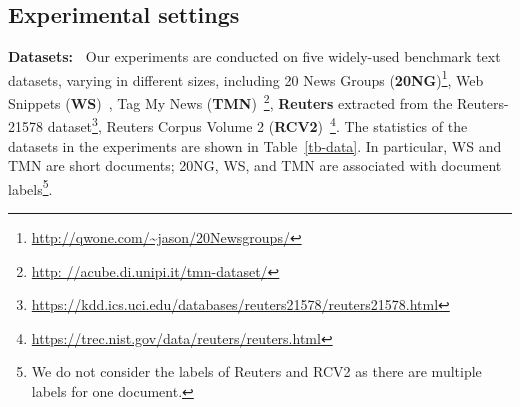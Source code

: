 \documentclass{article}
\newcommand{\rowa}[1]{\renewcommand{\arraystretch}{#1}}
\begin{document}
\subsection{Experimental settings}
\textbf{Datasets:~}
Our experiments are conducted on five widely-used benchmark text datasets, varying in different sizes, including 20 News Groups (\textbf{20NG})\footnote{\url{http://qwone.com/~jason/20Newsgroups/}}, Web Snippets (\textbf{WS})~\citep{phan2008learning}, Tag My News (\textbf{TMN})~\citep{vitale2012classification}\footnote{\url{http: //acube.di.unipi.it/tmn-dataset/}}, \textbf{Reuters} extracted from the Reuters-21578 dataset\footnote{\url{https://kdd.ics.uci.edu/databases/reuters21578/reuters21578.html}}, Reuters Corpus Volume 2 (\textbf{RCV2})~\citep{lewis2004rcv1}\footnote{\url{https://trec.nist.gov/data/reuters/reuters.html}}. The statistics of the datasets in the experiments are shown in Table~\ref{tb-data}. In particular, WS and TMN are short documents; 20NG, WS, and TMN are associated with document labels\footnote{We do not consider the labels of Reuters and RCV2 as there are multiple labels for one document.}. 

\begin{table}[]
\rowa{1.3}
\centering
\caption{Statistics of the datasets}
\label{tb-data}
\end{table}
\end{document}
